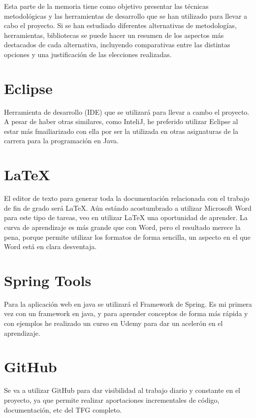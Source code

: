 
Esta parte de la memoria tiene como objetivo presentar las técnicas metodológicas y las herramientas de desarrollo que se han utilizado para llevar a cabo el proyecto. Si se han estudiado diferentes alternativas de metodologías, herramientas, bibliotecas se puede hacer un resumen de los aspectos más destacados de cada alternativa, incluyendo comparativas entre las distintas opciones y una justificación de las elecciones realizadas. 

\section{Eclipse}

Herramienta de desarrollo (IDE) que se utilizará para llevar a cambo el proyecto.
A pesar de haber otras similares, como InteliJ, he preferido utilizar Eclipse al estar más fmailiarizado con ella por ser la utilizada en otras asignaturas de la carrera para la programación en Java.

\section{LaTeX}
El editor de texto para generar toda la documentación relacionada con el trabajo de fin de grado será LaTeX.
Aún estándo acostumbrado a utilizar Microsoft Word para este tipo de tareas, veo en utilizar LaTeX una oportunidad de aprender.
La curva de aprendizaje es más grande que con Word, pero el resultado merece la pena, porque permite utilizar los formatos de forma sencilla, un aspecto en el que Word está en clara desventaja.
\section{Spring Tools}

Para la aplicación web en java se utilizará el Framework de Spring.
Es mi primera vez con un framework en java, y para aprender conceptos de forma más rápida y con ejemplos he realizado un curso en Udemy \cite{udemy:eliseo} para dar un acelerón en el aprendizaje.

\section{GitHub}

Se va a utilizar GitHub para dar visibilidad al trabajo diario y constante en el proyecto, ya que permite realizar aportaciones incrementales de código, documentación, etc del TFG completo.

